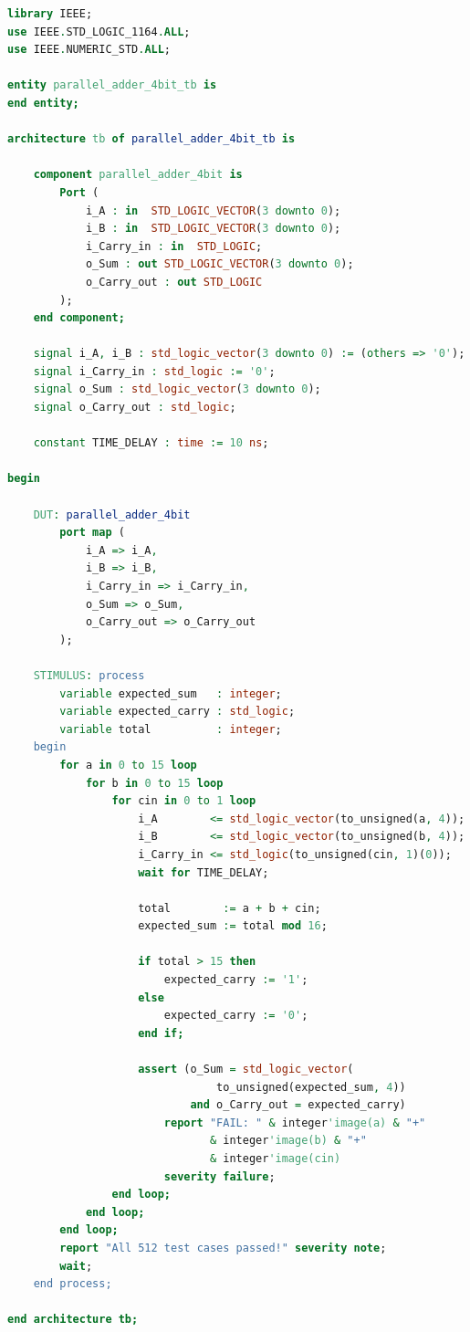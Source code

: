 \documentclass[12pt]{article}
\begin{document}
\begin{lstlisting}[language=VHDL]
library IEEE;
use IEEE.STD_LOGIC_1164.ALL;
use IEEE.NUMERIC_STD.ALL;

entity parallel_adder_4bit_tb is
end entity;

architecture tb of parallel_adder_4bit_tb is

    component parallel_adder_4bit is
        Port (
            i_A : in  STD_LOGIC_VECTOR(3 downto 0);
            i_B : in  STD_LOGIC_VECTOR(3 downto 0);
            i_Carry_in : in  STD_LOGIC;
            o_Sum : out STD_LOGIC_VECTOR(3 downto 0);
            o_Carry_out : out STD_LOGIC
        );
    end component;

    signal i_A, i_B : std_logic_vector(3 downto 0) := (others => '0');
    signal i_Carry_in : std_logic := '0';
    signal o_Sum : std_logic_vector(3 downto 0);
    signal o_Carry_out : std_logic;

    constant TIME_DELAY : time := 10 ns;

begin

    DUT: parallel_adder_4bit
        port map (
            i_A => i_A,
            i_B => i_B,
            i_Carry_in => i_Carry_in,
            o_Sum => o_Sum,
            o_Carry_out => o_Carry_out
        );

    STIMULUS: process
        variable expected_sum   : integer;
        variable expected_carry : std_logic;
        variable total          : integer;
    begin
        for a in 0 to 15 loop
            for b in 0 to 15 loop
                for cin in 0 to 1 loop
                    i_A        <= std_logic_vector(to_unsigned(a, 4));
                    i_B        <= std_logic_vector(to_unsigned(b, 4));
                    i_Carry_in <= std_logic(to_unsigned(cin, 1)(0));
                    wait for TIME_DELAY;

                    total        := a + b + cin;
                    expected_sum := total mod 16;

                    if total > 15 then
                        expected_carry := '1';
                    else
                        expected_carry := '0';
                    end if;

                    assert (o_Sum = std_logic_vector(
                                to_unsigned(expected_sum, 4))
                            and o_Carry_out = expected_carry)
                        report "FAIL: " & integer'image(a) & "+"
                               & integer'image(b) & "+"
                               & integer'image(cin)
                        severity failure;
                end loop;
            end loop;
        end loop;
        report "All 512 test cases passed!" severity note;
        wait;
    end process;

end architecture tb;
\end{lstlisting}
\end{document}
